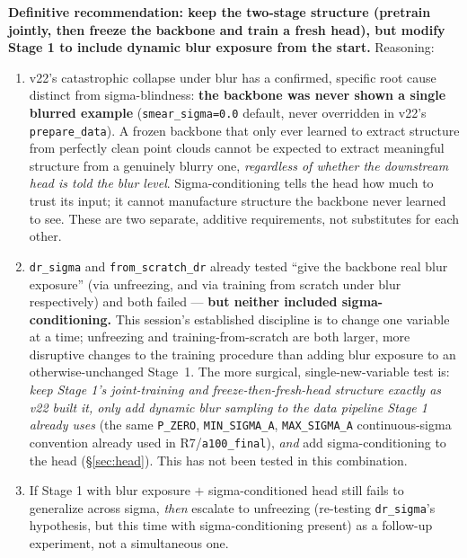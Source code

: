 \documentclass[11pt]{article}
\newcommand{\code}[1]{\texttt{#1}}
\begin{document}
\textbf{Definitive recommendation: keep the two-stage structure (pretrain jointly, then
freeze the backbone and train a fresh head), but modify Stage 1 to include dynamic blur
exposure from the start.} Reasoning:

\begin{enumerate}[leftmargin=*]
\item v22's catastrophic collapse under blur has a confirmed, specific root cause distinct
      from sigma-blindness: \textbf{the backbone was never shown a single blurred example}
      (\code{smear\_sigma=0.0} default, never overridden in v22's \code{prepare\_data}). A
      frozen backbone that only ever learned to extract structure from perfectly clean point
      clouds cannot be expected to extract meaningful structure from a genuinely blurry one,
      \emph{regardless of whether the downstream head is told the blur level}. Sigma-conditioning
      tells the head how much to trust its input; it cannot manufacture structure the backbone
      never learned to see. These are two separate, additive requirements, not substitutes for
      each other.
\item \code{dr\_sigma} and \code{from\_scratch\_dr} already tested ``give the backbone real
      blur exposure'' (via unfreezing, and via training from scratch under blur respectively)
      and both failed --- \textbf{but neither included sigma-conditioning.} This session's
      established discipline is to change one variable at a time; unfreezing and
      training-from-scratch are both larger, more disruptive changes to the training
      procedure than adding blur exposure to an otherwise-unchanged Stage~1. The more
      surgical, single-new-variable test is: \emph{keep Stage 1's joint-training and
      freeze-then-fresh-head structure exactly as v22 built it, only add dynamic blur
      sampling to the data pipeline Stage 1 already uses} (the same \code{P\_ZERO},
      \code{MIN\_SIGMA\_A}, \code{MAX\_SIGMA\_A} continuous-sigma convention already used in
      R7/\code{a100\_final}), \emph{and} add sigma-conditioning to the head
      (\S\ref{sec:head}). This has not been tested in this combination.
\item If Stage 1 with blur exposure $+$ sigma-conditioned head still fails to generalize
      across sigma, \emph{then} escalate to unfreezing (re-testing \code{dr\_sigma}'s
      hypothesis, but this time with sigma-conditioning present) as a follow-up experiment,
      not a simultaneous one.
\end{enumerate}
\end{document}
